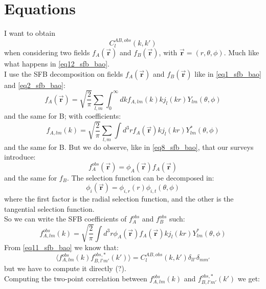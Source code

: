 \section{Equations}
I want to obtain 
\begin{equation}
    C_l^{AB, obs}(k,k')
\end{equation}
when considering two fields $f_A(\vec{\textbf{r}})$ and $f_B(\vec{\textbf{r}})$, with $\vec{\textbf{r}} = (r, \theta, \phi)$. Much like what happens in \ref{eq12_sfb_bao}. \\
I use the SFB decomposition on fields $f_A(\vec{\textbf{r}})$ and $f_B(\vec{\textbf{r}})$ like in \ref{eq1_sfb_bao} and \ref{eq2_sfb_bao}:
\begin{equation}
    f_A(\vec{\textbf{r}}) = \sqrt{\frac{2}{\pi}} \sum_{l,m} \int_{0}^{\infty} dk f_{A,lm}(k) k j_l(kr) Y_{lm}(\theta, \phi)
\end{equation}
and the same for B; with coefficients:
\begin{equation}
    f_{A,lm}(k) = \sqrt{\frac{2}{\pi}} \sum_{l,m} \int d^3r f_A(\vec{\textbf{r}}) k j_l(kr) Y^*_{lm}(\theta, \phi)
\end{equation}   
and the same for B. But we do observe, like in \ref{eq8_sfb_bao}, that our surveys introduce:
\begin{equation}
    f_A^{obs}(\vec{\textbf{r}}) = \phi_A(\vec{\textbf{r}}) f_A(\vec{\textbf{r}})
\end{equation}
and the same for $f_B$. The selection function can be decomposed in:
\begin{equation}
    \phi_i(\vec{\textbf{r}}) = \phi_{i,r}(r) \phi_{i,t}(\theta, \phi)
\end{equation}
where the first factor is the radial selection function, and the other is the tangential selection function. \\
So we can write the SFB coefficients of $f_A^{obs}$ and $f_B^{obs}$ such:
\begin{equation}
    f_{A,lm}^{obs}(k) = \sqrt{\frac{2}{\pi}} \int d^3r \phi_A(\vec{\textbf{r}}) f_A(\vec{\textbf{r}}) k j_l(kr) Y^*_{lm}(\theta, \phi)
\end{equation}
From \ref{eq11_sfb_bao} we know that:
\begin{equation}
\langle f^{obs}_{A,lm}(k) f^{obs, *}_{B,l'm'}(k')\rangle = C^{AB,obs}_l(k,k') \delta_{ll'}\delta_{mm'}
\end{equation}
but we have to compute it directly (?). \\
Computing the two-point correlation between $f^{obs}_{A,lm}(k)$ and $f^{obs, *}_{B,l'm'}(k')$ we get:
